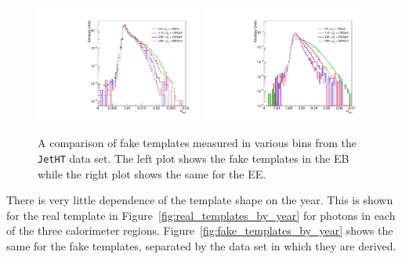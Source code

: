 \begin{figure}[!htbp]
\centering
\includegraphics[width=0.49\textwidth]{fig/faketemplatecompEB_jetht_2018.pdf}
\includegraphics[width=0.49\textwidth]{fig/faketemplatecompEE_jetht_2018.pdf}
\caption{A comparison of fake templates measured in various \pt bins from the \texttt{JetHT} data set. The left plot shows the fake templates in the EB while the right plot shows the same for the EE.}
\label{fig:fake_templates}
\end{figure}

There is very little dependence of the template shape on the year. This is shown for the real template in Figure~\ref{fig:real_templates_by_year} for photons in each of the three calorimeter regions. Figure~\ref{fig:fake_templates_by_year} shows the same for the fake templates, separated by the data set in which they are derived. 

